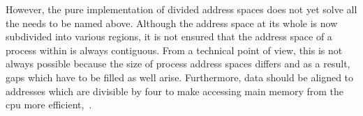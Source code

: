 However, the pure implementation of divided address spaces does not yet solve all the needs to be named above.
Although the address space at its whole is now subdivided into various regions, it is not ensured that the address space of a process within is always contiguous.
From a technical point of view, this is not always possible because the size of process address spaces differs and as a result, gaps which have to be filled as well arise\cite{mandl2014Grundkurs}.
Furthermore, data should be aligned to addresses which are divisible by four to make accessing main memory from the \ac{cpu} more efficient\cite{mandl2014Grundkurs},~\cite{brause2017betriebssysteme}.
%
%
 
